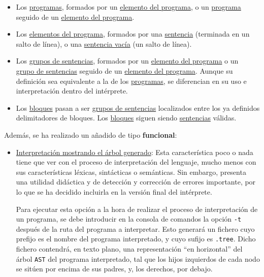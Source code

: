 \documentclass[12pt]{article}
\begin{document}
\begin{itemize}
    \item Los \underline{programas}, formados por un \underline{elemento del programa}, o un \underline{programa} seguido de un \underline{elemento del programa}.
    \item Los \underline{elementos del programa}, formados por una \underline{sentencia} (terminada en un salto de línea), o una \underline{sentencia vacía} (un salto de línea).\par
    \item Los \underline{grupos de sentencias}, formados por un \underline{elemento del programa} o un \\ \underline{grupo de sentencias} seguido de un \underline{elemento del programa}. Aunque su definición sea equivalente a la de los \underline{programas}, se diferencian en su uso e interpretación dentro del intérprete.
    \item Los \underline{bloques} pasan a ser \underline{grupos de sentencias} localizados entre los ya definidos delimitadores de bloques. Los \underline{bloques} siguen siendo \underline{sentencias} válidas.
\end{itemize}\par
Además, se ha realizado un añadido de tipo \textbf{funcional}:
\begin{itemize}
    \item \underline{Interpretación mostrando el árbol generado}: Esta característica poco o nada  tiene que ver con el proceso de interpretación del lenguaje, mucho menos con sus características léxicas, sintácticas o semánticas. Sin embargo, presenta una utilidad didáctica y de detección y corrección de errores importante, por lo que se ha decidido incluirla en la versión final del intérprete.\par Para ejecutar esta opción a la hora de realizar el proceso de interpretación de un programa, se debe introducir en la consola de comandos la opción \texttt{-t} después de la ruta del programa a interpretar. Esto generará un fichero cuyo prefijo es el nombre del programa interpretado, y cuyo sufijo es \texttt{.tree}. Dicho fichero contendrá, en texto plano, una representación ``en horizontal'' del árbol \texttt{AST} del programa interpretado, tal que los hijos izquierdos de cada nodo se sitúen por encima de sus padres, y, los derechos, por debajo.
\end{itemize}
\end{document}
